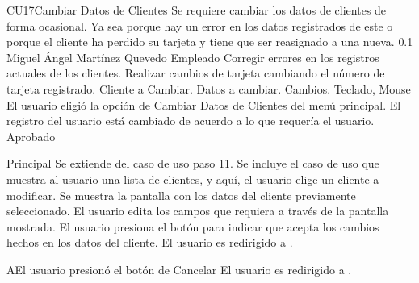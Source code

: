 \begin{UseCase}{CU17}{Cambiar Datos de Clientes}
{
    Se requiere cambiar los datos de clientes de forma ocasional. Ya sea porque hay un error en los
    datos registrados de este o porque el cliente ha perdido su tarjeta y tiene que ser reasignado a
    una nueva.
}
    {
	\color{Gray} 0.1
    }
    {
	\color{Gray} Miguel \'Angel Mart\'inez Quevedo
    }
    {
	\color{Gray}
    }
    {
	Empleado
    }
    {
	Corregir errores en los registros actuales de los clientes.
	Realizar cambios de tarjeta cambiando el n\'umero de tarjeta registrado.
    }
    {
	Cliente a Cambiar. Datos a cambiar. Cambios.
    }
    {
	Teclado, Mouse
    }
    {}
    {}
    {
	El usuario eligi\'o la opci\'on de Cambiar Datos de Clientes del men\'u principal.
    }
    {
	El registro del usuario est\'a cambiado de acuerdo a lo que requer\'ia el usuario.
    }
    {}
    {}
    {}
    {
		Aprobado
	}
\end{UseCase}

\begin{UCtrayectoria}{Principal}
    \UCpaso Se extiende del caso de uso  paso 11.
    \UCpaso Se incluye el caso de uso  que muestra al usuario una lista de clientes, y
    aqu\'i, el usuario elige un cliente a modificar.
    \UCpaso Se muestra la pantalla  con los datos del
    cliente previamente seleccionado.
    \UCpaso El usuario edita los campos que requiera a trav\'es de la pantalla mostrada.
    \UCpaso El usuario presiona el bot\'on  para indicar que acepta los cambios
    hechos en los datos del cliente.
    \UCpaso El usuario es redirigido a .
\end{UCtrayectoria}

\begin{UCtrayectoriaA}{A}{El usuario presion\'o el bot\'on de Cancelar}
    \UCpaso El usuario es redirigido a .
\end{UCtrayectoriaA}

